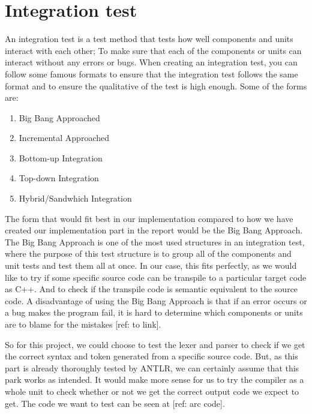 \section{Integration test}\label{subsec:integrationtest}


An integration test is a test method that tests how well components and units interact with each other; To make sure that each of the components or units can interact without any errors or bugs. When creating an integration test, you can follow some famous formats to ensure that the integration test follows the same format and to ensure the qualitative of the test is high enough. Some of the forms are:

\begin{enumerate}
    \item Big Bang Approached
    \item Incremental Approached
    \item Bottom-up Integration
    \item Top-down Integration
    \item Hybrid/Sandwhich Integration
\end{enumerate}

The form that would fit best in our implementation compared to how we have created our implementation part in the report would be the Big Bang Approach. The Big Bang Approach is one of the most used structures in an integration test, where the purpose of this test structure is to group all of the components and unit tests and test them all at once. In our case, this fits perfectly, as we would like to try if some specific source code can be transpile to a particular target code as C++. And to check if the transpile code is semantic equivalent to the source code. A disadvantage of using the Big Bang Approach is that if an error occurs or a bug makes the program fail, it is hard to determine which components or units are to blame for the mistakes [ref: to link].

So for this project, we could choose to test the lexer and parser to check if we get the correct syntax and token generated from a specific source code. But, as this part is already thoroughly tested by ANTLR, we can certainly assume that this park works as intended. It would make more sense for us to try the compiler as a whole unit to check whether or not we get the correct output code we expect to get. The code we want to test can be seen at [ref: arc code].


